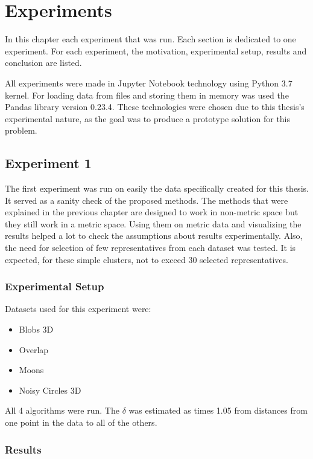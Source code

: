 \documentclass[thesis=B,english]{FITthesis}[2012/10/20]
\begin{document}
\chapter{Experiments}\label{ch:experiments}
In this chapter each experiment that was run.
Each section is dedicated to one experiment.
For each experiment, the motivation, experimental setup, results and conclusion are listed.

All experiments were made in Jupyter Notebook technology using Python 3.7 kernel.
For loading data from files and storing them in memory was used the Pandas library version 0.23.4.
These technologies were chosen due to this thesis's experimental nature, as the goal was to produce a prototype solution for this problem.

\section{Experiment 1}\label{sec:exp1}

The first experiment was run on easily the data specifically created for this thesis.
It served as a sanity check of the proposed methods.
The methods that were explained in the previous chapter are designed to work in non-metric space but they still work in a metric space.
Using them on metric data and visualizing the results helped a lot to check the assumptions about results experimentally.
Also, the need for selection of few representatives from each dataset was tested.
It is expected, for these simple clusters, not to exceed 30 selected representatives.

\subsection{Experimental Setup}
Datasets used for this experiment were:
\begin{itemize}
    \item Blobs 3D
    \item Overlap
    \item Moons
    \item Noisy Circles 3D
\end{itemize}

All 4 algorithms were run.
The $\delta$ was estimated as  times 1.05 from distances from one point in the data to all of the others.

\subsection{Results}
\end{document}

